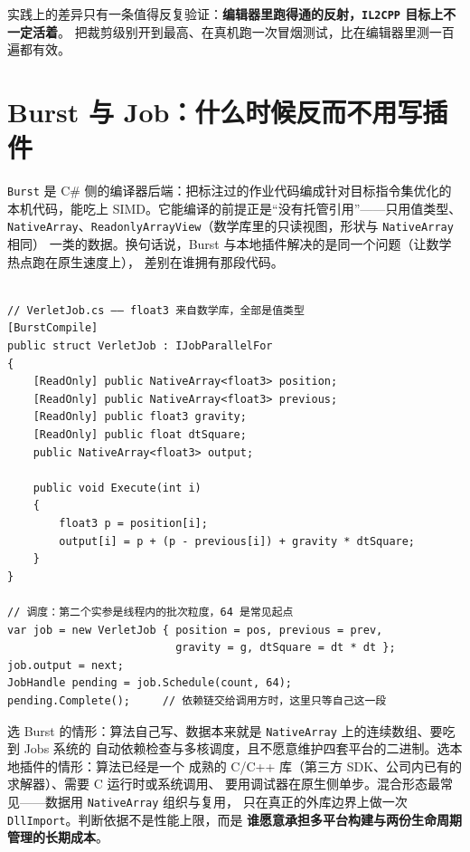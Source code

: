 \documentclass[12pt,a4paper,fontset=fandol]{ctexbook}
\newcommand{\Tp}[1]{\texttt{#1}}
\newcommand{\Bk}{\discretionary{}{}{}}
\newcommand{\Lang}[1]{\textsf{#1}}
\newcommand{\CL}{\Lang{C}}
\newcommand{\CPP}{\Lang{C++}}
\begin{document}
实践上的差异只有一条值得反复验证：\textbf{编辑器里跑得通的反射，\Tp{IL2CPP} 目标上不一定活着}。
把裁剪级别开到最高、在真机跑一次冒烟测试，比在编辑器里测一百遍都有效。

\section{Burst 与 Job：什么时候反而不用写插件}
\label{sec:ch11-burst-job}

\Tp{Burst} 是 \Lang{C\#} 侧的编译器后端：把标注过的作业代码编成针对目标指令集优化的
本机代码，能吃上 SIMD。它能编译的前提正是``没有托管引用''——只用值类型、
\Tp{NativeArray}、\Tp{ReadonlyArrayView}（数学库里的只读视图，形状与 \Tp{NativeArray} 相同）
一类的数据。换句话说，Burst 与本地插件解决的是同一个问题（让数学热点跑在原生速度上），
差别在谁拥有那段代码。

\begin{lstlisting}[style=cppstyle, caption={Burst 编译的并行作业：位置数组的显式积分}, label={lst:ch11-burst-job}, framexleftmargin=12pt, framexrightmargin=12pt]

// VerletJob.cs —— float3 来自数学库，全部是值类型
[BurstCompile]
public struct VerletJob : IJobParallelFor
{
    [ReadOnly] public NativeArray<float3> position;
    [ReadOnly] public NativeArray<float3> previous;
    [ReadOnly] public float3 gravity;
    [ReadOnly] public float dtSquare;
    public NativeArray<float3> output;

    public void Execute(int i)
    {
        float3 p = position[i];
        output[i] = p + (p - previous[i]) + gravity * dtSquare;
    }
}

// 调度：第二个实参是线程内的批次粒度，64 是常见起点
var job = new VerletJob { position = pos, previous = prev,
                          gravity = g, dtSquare = dt * dt };
job.output = next;
JobHandle pending = job.Schedule(count, 64);
pending.Complete();     // 依赖链交给调用方时，这里只等自己这一段
\end{lstlisting}

\begin{compare}[title={Burst 作业还是 C/C++ 插件}]
选 Burst 的情形：算法自己写、数据本来就是 \Tp{NativeArray} 上的连续数组、要吃到 Jobs 系统的
自动依赖检查与多核调度，且不愿意维护四套平台的二进制。选本地插件的情形：算法已经是一个
成熟的 \CL/{\Bk}\CPP{} 库（第三方 SDK、公司内已有的求解器）、需要 C 运行时或系统调用、
要用调试器在原生侧单步。混合形态最常见——数据用 \Tp{NativeArray} 组织与复用，
只在真正的外库边界上做一次 \Tp{DllImport}。判断依据不是性能上限，而是
\textbf{谁愿意承担多平台构建与两份生命周期管理的长期成本}。
\end{compare}
\end{document}
